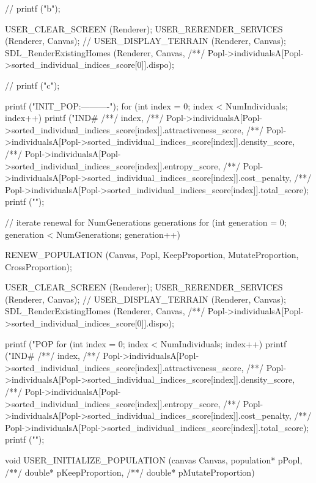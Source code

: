 \begin{C}
{	// printf ("b\n");
	
	USER_CLEAR_SCREEN (Renderer);
	USER_RERENDER_SERVICES (Renderer, Canvas);
	// USER_DISPLAY_TERRAIN (Renderer, Canvas);
	SDL_RenderExistingHomes (Renderer, Canvas,
	/**/ Popl->individualsA[Popl->sorted_individual_indices_score[0]].dispo);
	
	// printf ("c\n");
	
	printf ("INIT_POP:\n----------\n");
	for (int index = 0; index < NumIndividuals; index++){
		printf ("IND#%
		/**/ index,
		/**/ Popl->individualsA[Popl->sorted_individual_indices_score[index]].attractiveness_score,
		/**/ Popl->individualsA[Popl->sorted_individual_indices_score[index]].density_score,
		/**/ Popl->individualsA[Popl->sorted_individual_indices_score[index]].entropy_score,
		/**/ Popl->individualsA[Popl->sorted_individual_indices_score[index]].cost_penalty,
		/**/ Popl->individualsA[Popl->sorted_individual_indices_score[index]].total_score);
	}
	printf ("\n");
	
	// iterate renewal for NumGenerations generations
	for (int generation = 0; generation < NumGenerations; generation++){
		
		RENEW_POPULATION (Canvas, Popl, KeepProportion, MutateProportion, CrossProportion);
		
		USER_CLEAR_SCREEN (Renderer);
		USER_RERENDER_SERVICES (Renderer, Canvas);
		// USER_DISPLAY_TERRAIN (Renderer, Canvas);
		SDL_RenderExistingHomes (Renderer, Canvas,
		/**/ Popl->individualsA[Popl->sorted_individual_indices_score[0]].dispo);
		
		printf ("POP %
		for (int index = 0; index < NumIndividuals; index++){
			printf ("IND#%
			/**/ index,
			/**/ Popl->individualsA[Popl->sorted_individual_indices_score[index]].attractiveness_score,
			/**/ Popl->individualsA[Popl->sorted_individual_indices_score[index]].density_score,
			/**/ Popl->individualsA[Popl->sorted_individual_indices_score[index]].entropy_score,
			/**/ Popl->individualsA[Popl->sorted_individual_indices_score[index]].cost_penalty,
			/**/ Popl->individualsA[Popl->sorted_individual_indices_score[index]].total_score);
		}
		printf ("\n");
	}
}



void USER_INITIALIZE_POPULATION (canvas Canvas, population* pPopl,
/**/ double* pKeepProportion,
/**/ double* pMutateProportion){
	
}
\end{C}
